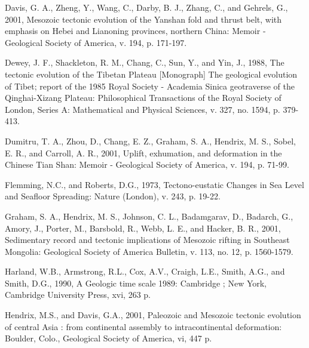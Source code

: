 \documentclass{article}
\begin{document}
\begin{description}
 \item Davis, G. A., Zheng, Y., Wang, C., Darby, B. J., Zhang, C., and
 Gehrels, G.,  2001, Mesozoic tectonic  evolution of the  Yanshan fold
 and  thrust belt,  with emphasis  on Hebei  and  Lianoning provinces,
 northern  China: Memoir  -  Geological Society  of  America, v.  194,
 p. 171-197.\\

 \item Dewey, J.  F., Shackleton, R. M., Chang, C.,  Sun, Y., and Yin,
 J., 1988,  The tectonic evolution of the  Tibetan Plateau [Monograph]
 The geological evolution of Tibet; report of the 1985 Royal Society -
 Academia   Sinica   geotraverse   of  the   Qinghai-Xizang   Plateau:
 Philosophical Transactions of the  Royal Society of London, Series A:
 Mathematical and Physical Sciences, v. 327, no. 1594, p. 379-413.\\

 \item Dumitru, T. A., Zhou, D., Chang, E. Z., Graham, S. A., Hendrix,
 M. S.,  Sobel, E. R., and  Carroll, A. R.,  2001, Uplift, exhumation,
 and deformation in the Chinese Tian Shan: Memoir - Geological Society
 of America, v. 194, p. 71-99.\\

 \item  Flemming,  N.C.,  and  Roberts, D.G.,  1973,  Tectono-eustatic
 Changes in Sea Level and Seafloor Spreading: Nature (London), v. 243,
 p. 19-22.\\

 \item Graham, S. A., Hendrix,  M. S., Johnson, C. L., Badamgarav, D.,
 Badarch, G.,  Amory, J., Porter, M.,  Barsbold, R., Webb,  L. E., and
 Hacker, B. R., 2001,  Sedimentary record and tectonic implications of
 Mesozoic rifting in Southeast Mongolia: Geological Society of America
 Bulletin, v. 113, no. 12, p. 1560-1579.

 \item Harland, W.B., Armstrong, R.L., Cox, A.V., Craigh, L.E., Smith,
 A.G., and Smith, D.G., 1990,  A Geologic time scale 1989: Cambridge ;
 New York, Cambridge University Press, xvi, 263 p.\\

 \item Hendrix,  M.S., and Davis,  G.A., 2001, Paleozoic  and Mesozoic
 tectonic  evolution of central  Asia :  from continental  assembly to
 intracontinental deformation:  Boulder, Colo., Geological  Society of
 America, vi, 447 p.\\


\end{description}
\end{document}

